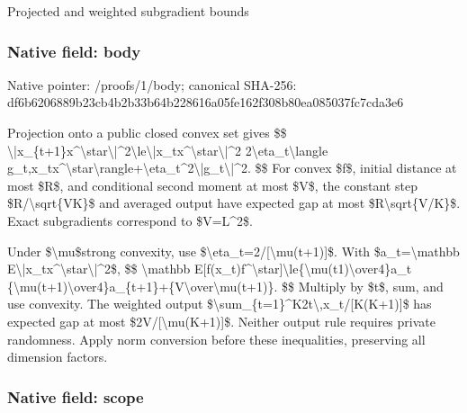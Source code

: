 \documentclass[10pt,a4paper]{article}
\begin{document}
Projected and weighted subgradient bounds


\subsubsection{Native field: body}


Native pointer: /proofs/1/body; canonical SHA-256: df6b6206889b23cb4b2b33b6\allowbreak{}4b228616a05fe162f308b80e\allowbreak{}a085037fc7cda3e6


Projection onto a public closed convex set gives
\$\$
\textbackslash{}|x\_\{t+1\}x\textasciicircum{}\textbackslash{}star\textbackslash{}|\textasciicircum{}2\textbackslash{}le\allowbreak{}\textbackslash{}|x\_tx\textasciicircum{}\textbackslash{}star\textbackslash{}|\textasciicircum{}2
2\textbackslash{}eta\_t\textbackslash{}langle g\_t,x\_tx\textasciicircum{}\textbackslash{}star\textbackslash{}rangle+\textbackslash{}\allowbreak{}eta\_t\textasciicircum{}2\textbackslash{}|g\_t\textbackslash{}|\textasciicircum{}2.
\$\$
For convex \$f\$, initial distance at most \$R\$, and conditional second moment at most \$V\$, the constant step \$R/\textbackslash{}sqrt\{VK\}\$ and averaged output have expected gap at most \$R\textbackslash{}sqrt\{V/K\}\$. Exact subgradients correspond to \$V=L\textasciicircum{}2\$.

Under \$\textbackslash{}mu\$strong convexity, use \$\textbackslash{}eta\_t=2/[\textbackslash{}mu(t+1)]\$. With \$a\_t=\textbackslash{}mathbb E\textbackslash{}|x\_tx\textasciicircum{}\textbackslash{}star\textbackslash{}|\textasciicircum{}2\$,
\$\$
\textbackslash{}mathbb E[f(x\_t)f\textasciicircum{}\textbackslash{}star]\textbackslash{}le\{\textbackslash{}mu(t1)\textbackslash{}over4\}a\_t
\{\textbackslash{}mu(t+1)\textbackslash{}over4\}a\_\{t+1\}\allowbreak{}+\{V\textbackslash{}over\textbackslash{}mu(t+1)\}.
\$\$
Multiply by \$t\$, sum, and use convexity. The weighted output
\$\textbackslash{}sum\_\{t=1\}\textasciicircum{}K2t\textbackslash{},x\_t/[K(K+1)]\$ has expected gap at most \$2V/[\textbackslash{}mu(K+1)]\$. Neither output rule requires private randomness. Apply norm conversion before these inequalities, preserving all dimension factors.


\subsubsection{Native field: scope}
\end{document}
